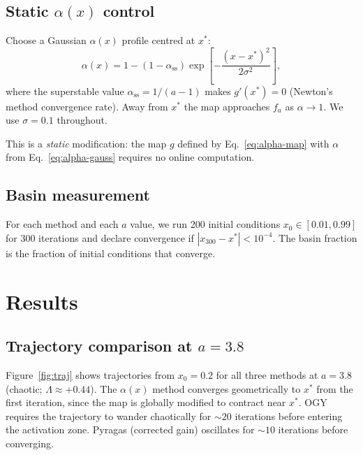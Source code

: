 \documentclass[aps,pre,twocolumn,superscriptaddress,nofootinbib,
               longbibliography,floatfix]{revtex4-2}
\newcommand{\xstar}{x^*}
\newcommand{\Lam}{\Lambda}
\begin{document}
\subsection{Static $\alpha(x)$ control}
\label{subsec:alpha}

Choose a Gaussian $\alpha(x)$ profile centred at $\xstar$:
%
\begin{equation}
  \alpha(x) = 1 - (1 - \alpha_{\mathrm{ss}})
    \exp\!\left[-\frac{(x - \xstar)^2}{2\sigma^2}\right],
  \label{eq:alpha-gauss}
\end{equation}
%
where the superstable value $\alpha_{\mathrm{ss}} = 1/(a-1)$
makes $g'(\xstar) = 0$ (Newton's method convergence rate).
Away from $\xstar$ the map approaches $f_a$ as $\alpha \to 1$.
We use $\sigma = 0.1$ throughout.

This is a \emph{static} modification: the map $g$ defined
by Eq.~\eqref{eq:alpha-map} with $\alpha$ from
Eq.~\eqref{eq:alpha-gauss} requires no online computation.

\subsection{Basin measurement}
\label{subsec:basin}

For each method and each $a$ value, we run 200 initial
conditions $x_0 \in [0.01, 0.99]$ for 300 iterations and
declare convergence if $|x_{300} - \xstar| < 10^{-4}$.
The basin fraction is the fraction of initial conditions
that converge.

\section{Results}
\label{sec:results}

\subsection{Trajectory comparison at $a = 3.8$}

Figure~\ref{fig:traj} shows trajectories from $x_0 = 0.2$ for
all three methods at $a = 3.8$ (chaotic; $\Lam \approx +0.44$).
The $\alpha(x)$ method converges geometrically to $\xstar$
from the first iteration, since the map is globally modified
to contract near $\xstar$.
OGY requires the trajectory to wander chaotically for
$\sim 20$ iterations before entering the activation zone.
Pyragas (corrected gain) oscillates for $\sim 10$ iterations
before converging.
\end{document}
